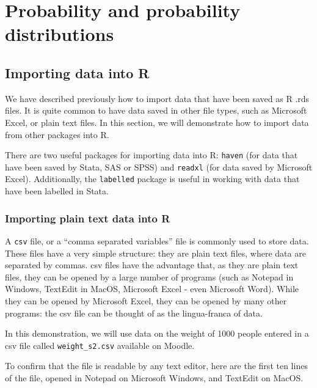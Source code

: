 \documentclass[
]{memoir}
\begin{document}
\hypertarget{probability-and-probability-distributions}{%
\chapter{Probability and probability distributions}\label{probability-and-probability-distributions}}

\hypertarget{importing-data-into-r}{%
\section{Importing data into R}\label{importing-data-into-r}}

We have described previously how to import data that have been saved as R .rds files. It is quite common to have data saved in other file types, such as Microsoft Excel, or plain text files. In this section, we will demonstrate how to import data from other packages into R.

There are two useful packages for importing data into R: \texttt{haven} (for data that have been saved by Stata, SAS or SPSS) and \texttt{readxl} (for data saved by Microsoft Excel). Additionally, the \texttt{labelled} package is useful in working with data that have been labelled in Stata.

\hypertarget{importing-plain-text-data-into-r}{%
\subsection{Importing plain text data into R}\label{importing-plain-text-data-into-r}}

A \texttt{csv} file, or a ``comma separated variables'' file is commonly used to store data. These files have a very simple structure: they are plain text files, where data are separated by commas. csv files have the advantage that, as they are plain text files, they can be opened by a large number of programs (such as Notepad in Windows, TextEdit in MacOS, Microsoft Excel - even Microsoft Word). While they can be opened by Microsoft Excel, they can be opened by many other programs: the csv file can be thought of as the lingua-franca of data.

In this demonstration, we will use data on the weight of 1000 people entered in a csv file called \texttt{weight\_s2.csv} available on Moodle.

To confirm that the file is readable by any text editor, here are the first ten lines of the file, opened in Notepad on Microsoft Windows, and TextEdit on MacOS.
\end{document}
